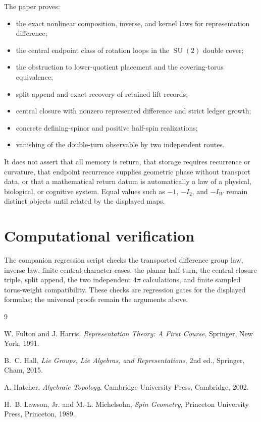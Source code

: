 \documentclass[11pt,letterpaper]{article}
\theoremstyle{returnstyle}
\newcommand{\SU}{\operatorname{SU}}
\begin{document}
The paper proves:
\begin{itemize}
  \item the exact nonlinear composition, inverse, and kernel laws for representation difference;
  \item the central endpoint class of rotation loops in the $\SU(2)$ double cover;
  \item the obstruction to lower-quotient placement and the covering-torus equivalence;
  \item split append and exact recovery of retained lift records;
  \item central closure with nonzero represented difference and strict ledger growth;
  \item concrete defining-spinor and positive half-spin realizations;
  \item vanishing of the double-turn observable by two independent routes.
\end{itemize}

It does not assert that all memory is return, that storage requires recurrence or curvature, that endpoint recurrence supplies geometric phase without transport data, or that a mathematical return datum is automatically a law of a physical, biological, or cognitive system.  Equal values such as $-1$, $-I_2$, and $-I_W$ remain distinct objects until related by the displayed maps.

\section{Computational verification}

The companion regression script checks the transported difference group law, inverse law, finite central-character cases, the planar half-turn, the central closure triple, split append, the two independent $4\pi$ calculations, and finite sampled torus-weight compatibility.  These checks are regression gates for the displayed formulas; the universal proofs remain the arguments above.

\begin{thebibliography}{9}
\small

W. Fulton and J. Harris,
\emph{Representation Theory: A First Course},
Springer, New York, 1991.

B.~C. Hall,
\emph{Lie Groups, Lie Algebras, and Representations},
2nd ed., Springer, Cham, 2015.

A. Hatcher,
\emph{Algebraic Topology},
Cambridge University Press, Cambridge, 2002.

H.~B. Lawson, Jr. and M.-L. Michelsohn,
\emph{Spin Geometry},
Princeton University Press, Princeton, 1989.

\end{thebibliography}
\end{document}
